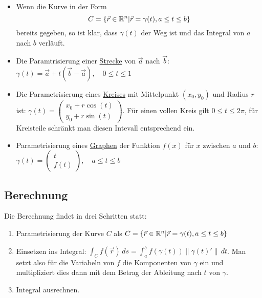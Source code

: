 \begin{itemize}[leftmargin=*]
	\item Wenn die Kurve in der Form
	\[
	C = \{\vec{r} \in \mathbb{R}^n | \vec{r} = \gamma(t), a \leq t \leq b\}
	\]
	bereits gegeben, so ist klar, dass $\gamma(t)$ der Weg ist und das Integral von
	$a$ nach $b$ verläuft.
	
	\item Die Paramtrisierung einer \underline{Strecke} von $\vec{a}$ nach $\vec{b}$:
	$\gamma(t) = \vec{a} + t(\vec{b}-\vec{a}), \quad 0 \leq t \leq 1$
	
	\item Die Parametrisierung eines \underline{Kreises} mit Mittelpunkt $(x_0, y_0)$ und
	Radius $r$ ist: $\gamma(t) =
	\begin{pmatrix}
	x_0 + r \cos(t)\\
	y_0 + r \sin(t)
	\end{pmatrix}$. Für einen vollen Kreis gilt $0 \leq t \leq 2\pi$, für Kreisteile
	schränkt man diesen Intevall entsprechend ein.
	
	\item Parametrisierung eines \underline{Graphen} der Funktion $f(x)$ für $x$
	zwischen $a$ und $b$: $\gamma(t) =
	\begin{pmatrix}
	t\\
	f(t)
	\end{pmatrix}, \quad a \leq t \leq b$
\end{itemize}

\subsection{Berechnung}
Die Berechnung findet in drei Schritten statt:
\begin{enumerate}[leftmargin=*]
	\item Parametrisierung der Kurve $C$ als $C = \{\vec{r} \in \mathbb{R}^n | \vec{r} = \gamma(t), a \leq t \leq b\}$
	\item Einsetzen ins Integral: $\int_C f(\vec{r})\,ds = \int_a^b f(\gamma(t)) \|\gamma(t)'\|\,dt$.
	Man setzt also für die Variabeln von $f$ die Komponenten von $\gamma$ ein und
	multipliziert dies dann mit dem Betrag der Ableitung nach $t$ von $\gamma$.
	\item Integral ausrechnen.
\end{enumerate}
